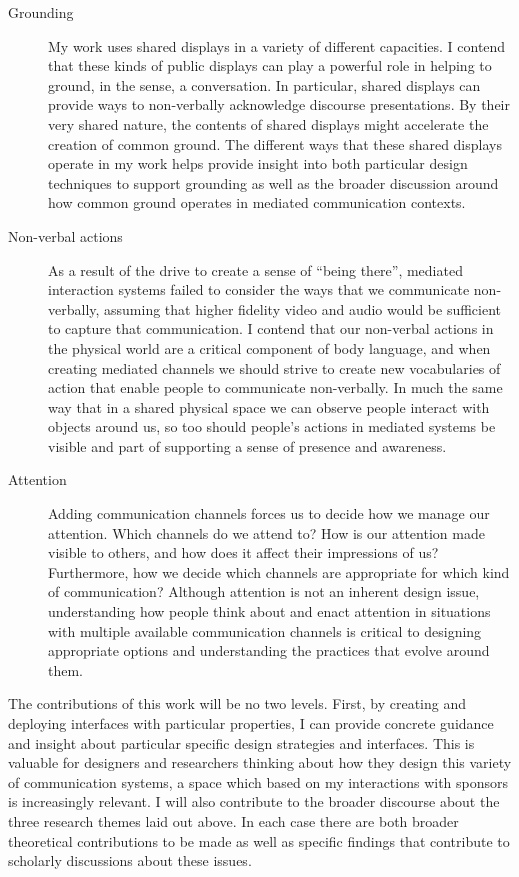 \documentclass{tufte-handout}
\begin{document}
\begin{description}
	\item[Grounding]{My work uses shared displays in a variety of different capacities. I contend that these kinds of public displays can play a powerful role in helping to ground, in the \citet{Clark:1989uc} sense, a conversation. In particular, shared displays can provide ways to non-verbally acknowledge discourse presentations. By their very shared nature, the contents of shared displays might accelerate the creation of common ground. The different ways that these shared displays operate in my work helps provide insight into both particular design techniques to support grounding as well as the broader discussion around how common ground operates in mediated communication contexts.}
	\item[Non-verbal actions]{As a result of the drive to create a sense of ``being there'', mediated interaction systems failed to consider the ways that we communicate non-verbally, assuming that higher fidelity video and audio would be sufficient to capture that communication. I contend that our non-verbal actions in the physical world are a critical component of body language, and when creating mediated channels we should strive to create new vocabularies of action that enable people to communicate non-verbally. In much the same way that in a shared physical space we can observe people interact with objects around us, so too should people's actions in mediated systems be visible and part of supporting a sense of presence and awareness.}
	\item[Attention]{Adding communication channels forces us to decide how we manage our attention. Which channels do we attend to? How is our attention made visible to others, and how does it affect their impressions of us? Furthermore, how we decide which channels are appropriate for which kind of communication? Although attention is not an inherent design issue, understanding  how people think about and enact attention in situations with multiple available communication channels is critical to designing appropriate options and understanding the practices that evolve around them.}
\end{description}

The contributions of this work will be no two levels. First, by creating and deploying interfaces with particular properties, I can provide concrete guidance and insight about particular specific design strategies and interfaces. This is valuable for designers and researchers thinking about how they design this variety of communication systems, a space which based on my interactions with sponsors is increasingly relevant. I will also contribute to the broader discourse about the three research themes laid out above. In each case there are both broader theoretical contributions to be made as well as specific findings that contribute to scholarly discussions about these issues.
\end{document}
